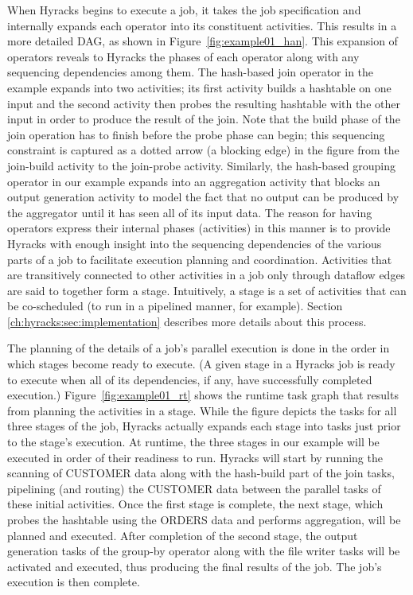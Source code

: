 When Hyracks begins to execute a job, it takes the job specification and internally expands each operator into its
constituent activities.
This results in a more detailed DAG, as shown in Figure~\ref{fig:example01_han}.
This expansion of operators reveals to Hyracks the phases of each operator along with any sequencing dependencies among them.
The hash-based join operator in the example expands into two activities; its first activity builds a hashtable on one input
and the second activity then probes the resulting hashtable with the other input in order to produce the result of the join.
Note that the build phase of the join operation has to finish before the probe phase can begin;
this sequencing constraint is captured as a dotted arrow (a blocking edge) in the figure from the join-build activity to the join-probe activity.
Similarly, the hash-based grouping operator in our example expands into an aggregation activity that blocks an output generation activity to
model the fact that no output can be produced by the aggregator until it has seen all of its input data.
The reason for having operators express their internal phases (activities) in this manner is to provide Hyracks with enough insight into the
sequencing dependencies of the various parts of a job to facilitate execution planning and coordination.
Activities that are transitively connected to other activities in a job only through dataflow edges are said to together form a stage.
Intuitively, a stage is a set of activities that can be co-scheduled (to run in a pipelined manner, for example).
Section \ref{ch:hyracks:sec:implementation} describes more details about this process.

The planning of the details of a job's parallel execution is done in the order in which stages become ready to execute.
(A given stage in a Hyracks job is ready to execute when all of its dependencies, if any, have successfully completed execution.)
Figure~\ref{fig:example01_rt} shows the runtime task graph that results from planning the activities in a stage.
While the figure depicts the tasks for all three stages of the job, Hyracks actually expands each stage into tasks just prior to the stage's execution.
At runtime, the three stages in our example will be executed in order of their readiness to run.
Hyracks will start by running the scanning of CUSTOMER data along with the hash-build part of the join tasks,
pipelining (and routing) the CUSTOMER data between the parallel tasks of these initial activities.
Once the first stage is complete, the next stage, which probes the hashtable using the ORDERS data and performs aggregation,
will be planned and executed. After completion of the second stage, the output generation tasks of the group-by operator along
with the file writer tasks will be activated and executed, thus producing the final results of the job.
The job's execution is then complete.

